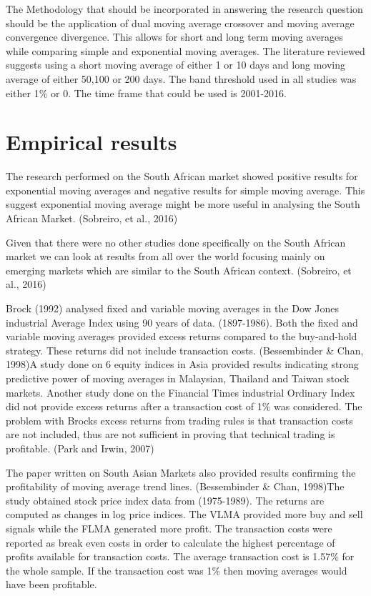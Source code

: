 \documentclass[12pt,preprint, authoryear]{elsarticle}
\numberwithin{equation}{section}
\numberwithin{figure}{section}
\numberwithin{table}{section}
\begin{document}
The Methodology that should be incorporated in answering the research
question should be the application of dual moving average crossover and
moving average convergence divergence. This allows for short and long
term moving averages while comparing simple and exponential moving
averages. The literature reviewed suggests using a short moving average
of either 1 or 10 days and long moving average of either 50,100 or 200
days. The band threshold used in all studies was either 1\% or 0. The
time frame that could be used is 2001-2016.

\section{Empirical results}\label{empirical-results}

The research performed on the South African market showed positive
results for exponential moving averages and negative results for simple
moving average. This suggest exponential moving average might be more
useful in analysing the South African Market. (Sobreiro, et al., 2016)

Given that there were no other studies done specifically on the South
African market we can look at results from all over the world focusing
mainly on emerging markets which are similar to the South African
context. (Sobreiro, et al., 2016)

Brock (1992) analysed fixed and variable moving averages in the Dow
Jones industrial Average Index using 90 years of data. (1897-1986). Both
the fixed and variable moving averages provided excess returns compared
to the buy-and-hold strategy. These returns did not include transaction
costs. (Bessembinder \& Chan, 1998)A study done on 6 equity indices in
Asia provided results indicating strong predictive power of moving
averages in Malaysian, Thailand and Taiwan stock markets. Another study
done on the Financial Times industrial Ordinary Index did not provide
excess returns after a transaction cost of 1\% was considered. The
problem with Brocks excess returns from trading rules is that
transaction costs are not included, thus are not sufficient in proving
that technical trading is profitable. (Park and Irwin, 2007)

The paper written on South Asian Markets also provided results
confirming the profitability of moving average trend lines.
(Bessembinder \& Chan, 1998)The study obtained stock price index data
from (1975-1989). The returns are computed as changes in log price
indices. The VLMA provided more buy and sell signals while the FLMA
generated more profit. The transaction costs were reported as break even
costs in order to calculate the highest percentage of profits available
for transaction costs. The average transaction cost is 1.57\% for the
whole sample. If the transaction cost was 1\% then moving averages would
have been profitable.
\end{document}
